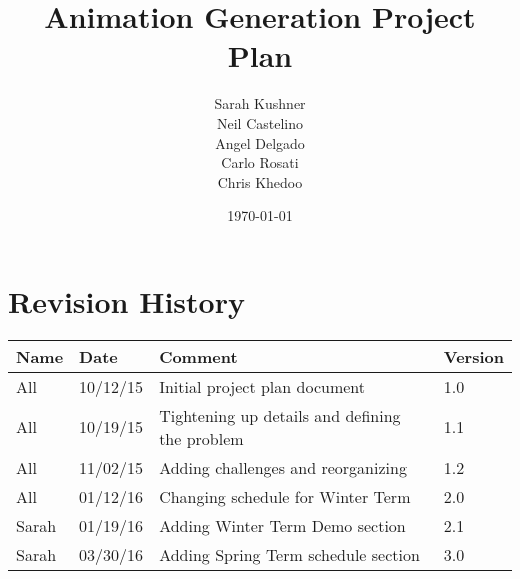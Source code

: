 \documentclass{article}
\begin{document}
\title{Animation Generation Project Plan}
\author{Sarah Kushner \\
		Neil Castelino \\
		Angel Delgado \\
		Carlo Rosati \\
		Chris Khedoo}
\date{\today}
\maketitle

\pagebreak
\tableofcontents
\pagebreak

\section{Revision History}
\begin{table}[hp]
\centering
\begin{tabular}{|l|l|l|l|}
\hline
Name 		& Date	 		& 	Comment	 								& 	Version	 \\ \hline
All		& 10/12/15		& 	Initial project plan document			&  	1.0 		 \\ \hline
All		& 10/19/15		& 	Tightening up details and defining the problem			&  	1.1 		 \\ \hline
All		& 11/02/15		& 	Adding challenges and reorganizing			&  	1.2 		 \\ \hline
All		& 01/12/16		& 	Changing schedule for Winter Term			&  	2.0 		 \\ \hline
Sarah		& 01/19/16		& 	Adding Winter Term Demo section			&  	2.1 		 \\ \hline
Sarah		& 03/30/16		& 	Adding Spring Term schedule section			&  	3.0 		 \\ \hline
\end{tabular}
\end{table}

\pagebreak

















\end{document}
